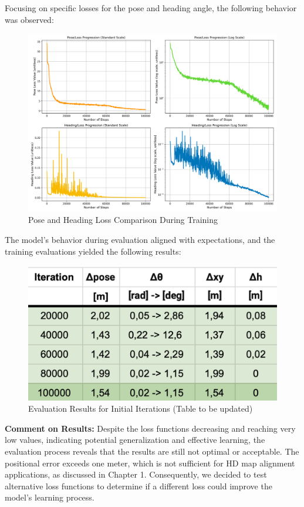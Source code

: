 Focusing on specific losses for the pose and heading angle, the following behavior was observed:

\begin{figure}[H]
    \centering
    \includegraphics[width=1\linewidth]{LateX//figs/mse_pose_heading_loss_comparison.png}
    \caption{Pose and Heading Loss Comparison During Training}
    \label{fig:pose-heading-loss}
\end{figure}

The model's behavior during evaluation aligned with expectations, and the training evaluations yielded the following results:

\begin{figure}[H]
    \centering
    \includegraphics[width=0.75\linewidth]{LateX//figs/tabella_iteration1.png}
    \caption{Evaluation Results for Initial Iterations (Table to be updated)}
    \label{fig:evaluation-results}
\end{figure}

\textbf{Comment on Results:} Despite the loss functions decreasing and reaching very low values, indicating potential generalization and effective learning, the evaluation process reveals that the results are still not optimal or acceptable. The positional error exceeds one meter, which is not sufficient for HD map alignment applications, as discussed in Chapter 1. Consequently, we decided to test alternative loss functions to determine if a different loss could improve the model’s learning process.

